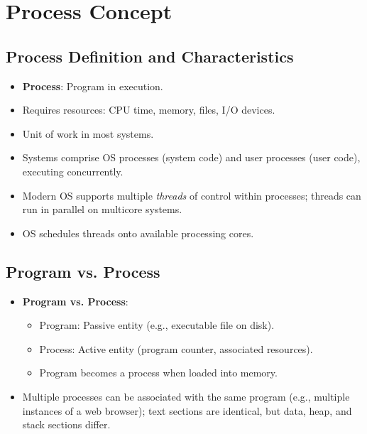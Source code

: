 \section{Process Concept}\label{sec:3.1}

\subsection{Process Definition and Characteristics}
\begin{itemize}
    \item \textbf{Process}: Program in execution.
    \item Requires resources: CPU time, memory, files, I/O devices.
    \item Unit of work in most systems.
    \item Systems comprise OS processes (system code) and user processes (user code), executing concurrently.
    \item Modern OS supports multiple \textit{threads} of control within processes; threads can run in parallel on multicore systems.
    \item OS schedules threads onto available processing cores.
\end{itemize}

\subsection{Program vs. Process}
\begin{itemize}
    \item \textbf{Program vs. Process}:
        \begin{itemize}
            \item Program: Passive entity (e.g., executable file on disk).
            \item Process: Active entity (program counter, associated resources).
            \item Program becomes a process when loaded into memory.
        \end{itemize}
    \item Multiple processes can be associated with the same program (e.g., multiple instances of a web browser); text sections are identical, but data, heap, and stack sections differ.
\end{itemize}

